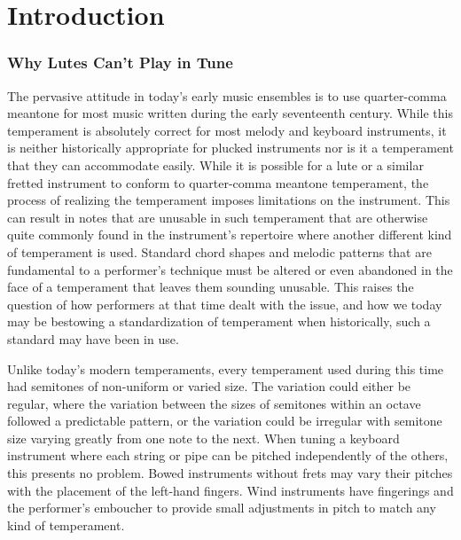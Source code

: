 \chapter*{Introduction}
\subsection*{Why Lutes Can't Play in Tune}

The pervasive attitude in today's early music ensembles is to use quarter-comma meantone
for most music written during the early seventeenth century. While this temperament is
absolutely correct for most melody and keyboard instruments, it is neither historically
appropriate for plucked instruments nor is it a temperament that they can accommodate
easily.  While it is possible for a lute or a similar fretted instrument to conform to
quarter-comma meantone temperament, the process of realizing the temperament imposes
limitations on the instrument.  This can result in notes that are unusable in such
temperament that are otherwise quite commonly found in the instrument's repertoire where
another different kind of temperament is used.  Standard chord shapes and melodic patterns
that are fundamental to a performer's technique must be altered or even abandoned in the
face of a temperament that leaves them sounding unusable.  This raises the question of how
performers at that time dealt with the issue, and how we today may be bestowing a
standardization of temperament when historically, such a standard may have been in use.

Unlike today's modern temperaments, every temperament used during this time had semitones
of non-uniform or varied size.  The variation could either be regular, where the variation
between the sizes of semitones within an octave followed a predictable pattern, or the
variation could be irregular with semitone size varying greatly from one note to the next.
When tuning a keyboard instrument where each string or pipe can be pitched independently
of the others, this presents no problem.  Bowed instruments without frets may vary their
pitches with the placement of the left-hand fingers.  Wind instruments have fingerings and
the performer's emboucher to provide small adjustments in pitch to match any kind of
temperament.

